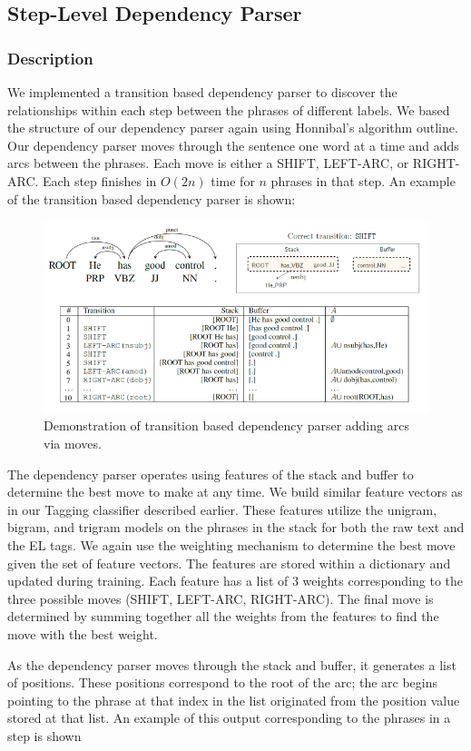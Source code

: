 \subsection{Step-Level Dependency Parser}

\subsubsection{Description}
We implemented a transition based dependency parser to discover the relationships within each step between the phrases of different labels. We based the structure of our dependency parser again using Honnibal's algorithm outline.\cite{honnibal} Our dependency parser moves through the sentence one word at a time and adds arcs between the phrases. Each move is either a SHIFT, LEFT-ARC, or RIGHT-ARC. Each step finishes in $O(2n)$ time for $n$ phrases in that step. An example of the transition based dependency parser is shown:

\begin{figure}
  \centering
    \includegraphics[width=.5\textwidth]{parser1.png}
  \caption{Demonstration of transition based dependency parser adding arcs via moves. \cite{864}}
\end{figure}

The dependency parser operates using features of the stack and buffer to determine the best move to make at any time. We build similar feature vectors as in our Tagging classifier described earlier. These features utilize the unigram, bigram, and trigram models on the phrases in the stack for both the raw text and the EL tags. We again use the weighting mechanism to determine the best move given the set of feature vectors. The features are stored within a dictionary and updated during training. Each feature has a list of 3 weights corresponding to the three possible moves (SHIFT, LEFT-ARC, RIGHT-ARC). The final move is determined by summing together all the weights from the features to find the move with the best weight. 

As the dependency parser moves through the stack and buffer, it generates a list of positions. These positions correspond to the root of the arc; the arc begins pointing to the phrase at that index in the list originated from the position value stored at that list. An example of this output corresponding to the phrases in a step is shown

